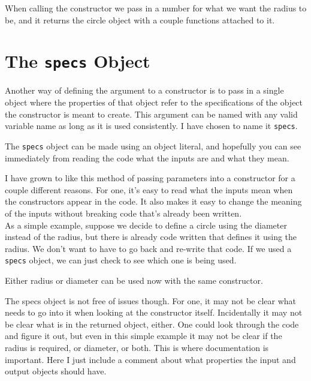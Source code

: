 

When calling the constructor we pass in a number for what we want the radius to be, and it returns the circle object with a couple functions attached to it.


\section{The \texttt{specs} Object}

Another way of defining the argument to a constructor is to pass in a single object where the properties of that object refer to the specifications of the object the constructor is meant to create. This argument can be named with any valid variable name as long as it is used consistently. I have chosen to name it \texttt{specs}.


The \texttt{specs} object can be made using an object literal, and hopefully you can see immediately from reading the code what the inputs are and what they mean.




I have grown to like this method of passing parameters into a constructor for a couple different reasons. For one, it's easy to read what the inputs mean when the constructors appear in the code. It also makes it easy to change the meaning of the inputs without breaking code that's already been written.\\

As a simple example, suppose we decide to define a circle using the diameter instead of the radius, but there is already code written that defines it using the radius. We don't want to have to go back and re-write that code. If we used a \texttt{specs} object, we can just check to see which one is being used.


Either radius or diameter can be used now with the same constructor.


The specs object is not free of issues though. For one, it may not be clear what needs to go into it when looking at the constructor itself. Incidentally it may not be clear what is in the returned object, either. One could look through the code and figure it out, but even in this simple example it may not be clear if the radius is required, or diameter, or both. This is where documentation is important. Here I just include a comment about what properties the input and output objects should have.

